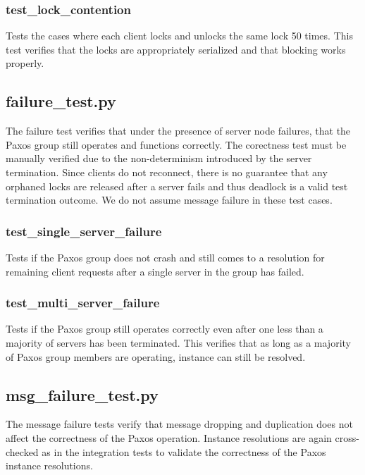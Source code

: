 \documentclass{article}
\begin{document}
\subsubsection{test\_lock\_contention}

Tests the cases where each client locks and unlocks the same lock 50 times.
This test verifies that the locks are appropriately serialized and that blocking works properly.

\subsection{failure\_test.py}

The failure test verifies that under the presence of server node failures, that the Paxos group still operates and functions correctly.
The corectness test must be manually verified due to the non-determinism introduced by the server termination.
Since clients do not reconnect, there is no guarantee that any orphaned locks are released after a server fails and thus deadlock is a valid test termination outcome.
We do not assume message failure in these test cases.

\subsubsection{test\_single\_server\_failure}

Tests if the Paxos group does not crash and still comes to a resolution for remaining client requests after a single server in the group has failed.

\subsubsection{test\_multi\_server\_failure}

Tests if the Paxos group still operates correctly even after one less than a majority of servers has been terminated.
This verifies that as long as a majority of Paxos group members are operating, instance can still be resolved.

\subsection{msg\_failure\_test.py}

The message failure tests verify that message dropping and duplication does not affect the correctness of the Paxos operation.
Instance resolutions are again cross-checked as in the integration tests to validate the correctness of the Paxos instance resolutions.
\end{document}
